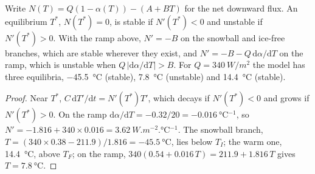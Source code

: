 \begin{proposition}\label{prop:b3:climate-models:three}
Write $N(T) = Q(1 - \alpha(T)) - (A + BT)$ for the net downward flux. An
equilibrium $T^*$, $N(T^*) = 0$, is stable if $N'(T^*) < 0$ and unstable if
$N'(T^*) > 0$. With the ramp above, $N' = -B$ on the snowball and
ice-free branches, which are stable wherever they exist, and $N' = -B -
Q\,\mathrm d\alpha/\mathrm dT$ on the ramp, which is unstable when $Q\,
|\mathrm d\alpha/\mathrm dT| > B$. For $Q = \qty{340}{W/m^2}$ the model has
three equilibria, \qty{-45.5}{\celsius} (stable), \qty{7.8}{\celsius}
(unstable) and \qty{14.4}{\celsius} (stable).
\end{proposition}

\begin{proof}
Near $T^*$, $C\,\mathrm dT'/\mathrm dt = N'(T^*)T'$, which decays if
$N'(T^*) < 0$ and grows if $N'(T^*) > 0$. On the ramp $\mathrm d\alpha/
\mathrm dT = -0.32/20 = \qty{-0.016}{\celsius^{-1}}$, so $N' = -1.816 + 340
\times 0.016 = \qty{+3.62}{W.m^{-2}.\celsius^{-1}}$. The snowball branch,
$T = (340\times0.38 - 211.9)/1.816 = \qty{-45.5}{\celsius}$, lies below
$T_I$; the warm one, \qty{14.4}{\celsius}, above $T_F$; on the ramp,
$340(0.54 + 0.016\,T) = 211.9 + 1.816\,T$ gives $T = \qty{7.8}{\celsius}$.
\end{proof}

